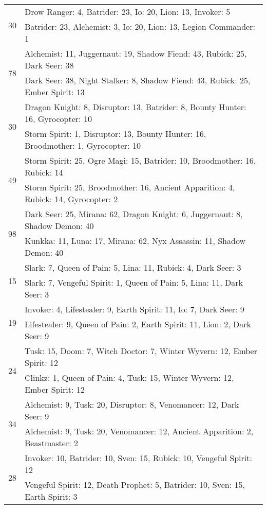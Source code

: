 \documentclass[result.tex]{subfiles}
\begin{document}
\begin{table}[H]
\begin{tabular}{ | c | p{12.5cm} | }
\hline
\multirow{2}{*}{30}
& Drow Ranger: 4, Batrider: 23, Io: 20, Lion: 13, Invoker: 5 \\
& Batrider: 23, Alchemist: 3, Io: 20, Lion: 13, Legion Commander: 1 \\
\hline
\multirow{2}{*}{78}
& Alchemist: 11, Juggernaut: 19, Shadow Fiend: 43, Rubick: 25, Dark Seer: 38 \\
& Dark Seer: 38, Night Stalker: 8, Shadow Fiend: 43, Rubick: 25, Ember Spirit: 13 \\
\hline
\multirow{2}{*}{30}
& Dragon Knight: 8, Disruptor: 13, Batrider: 8, Bounty Hunter: 16, Gyrocopter: 10 \\
& Storm Spirit: 1, Disruptor: 13, Bounty Hunter: 16, Broodmother: 1, Gyrocopter: 10 \\
\hline
\multirow{2}{*}{49}
& Storm Spirit: 25, Ogre Magi: 15, Batrider: 10, Broodmother: 16, Rubick: 14 \\
& Storm Spirit: 25, Broodmother: 16, Ancient Apparition: 4, Rubick: 14, Gyrocopter: 2 \\
\hline
\multirow{2}{*}{98}
& Dark Seer: 25, Mirana: 62, Dragon Knight: 6, Juggernaut: 8, Shadow Demon: 40 \\
& Kunkka: 11, Luna: 17, Mirana: 62, Nyx Assassin: 11, Shadow Demon: 40 \\
\hline
\multirow{2}{*}{15}
& Slark: 7, Queen of Pain: 5, Lina: 11, Rubick: 4, Dark Seer: 3 \\
& Slark: 7, Vengeful Spirit: 1, Queen of Pain: 5, Lina: 11, Dark Seer: 3 \\
\hline
\multirow{2}{*}{19}
& Invoker: 4, Lifestealer: 9, Earth Spirit: 11, Io: 7, Dark Seer: 9 \\
& Lifestealer: 9, Queen of Pain: 2, Earth Spirit: 11, Lion: 2, Dark Seer: 9 \\
\hline
\multirow{2}{*}{24}
& Tusk: 15, Doom: 7, Witch Doctor: 7, Winter Wyvern: 12, Ember Spirit: 12 \\
& Clinkz: 1, Queen of Pain: 4, Tusk: 15, Winter Wyvern: 12, Ember Spirit: 12 \\
\hline
\multirow{2}{*}{34}
& Alchemist: 9, Tusk: 20, Disruptor: 8, Venomancer: 12, Dark Seer: 9 \\
& Alchemist: 9, Tusk: 20, Venomancer: 12, Ancient Apparition: 2, Beastmaster: 2 \\
\hline
\multirow{2}{*}{28}
& Invoker: 10, Batrider: 10, Sven: 15, Rubick: 10, Vengeful Spirit: 12 \\
& Vengeful Spirit: 12, Death Prophet: 5, Batrider: 10, Sven: 15, Earth Spirit: 3 \\

\end{tabular}
\end{table}
\end{document}
